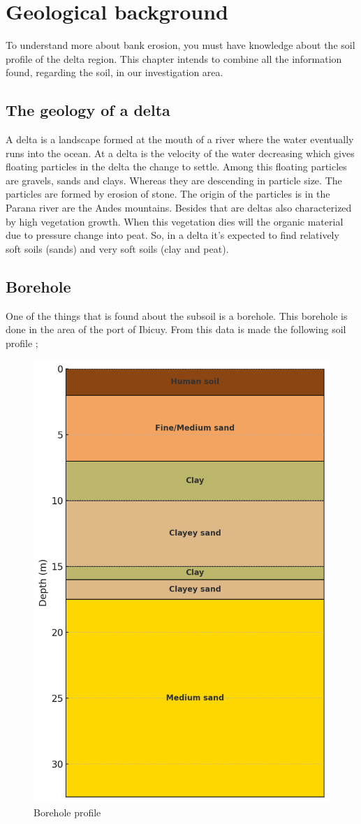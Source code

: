 \chapter{Geological background}

To understand more about bank erosion, you must have knowledge about the soil profile of the delta region. This chapter intends to combine all the information found, regarding the soil, in our investigation area.

\section{The geology of a delta}
A delta is a landscape formed at the mouth of a river where the water eventually runs into the ocean. At a delta is the velocity of the water decreasing which gives floating particles in the delta the change to settle. Among this floating particles are gravels, sands and clays. Whereas they are descending in particle size. The particles are formed by erosion of stone. The origin of the particles is in the Parana river are the Andes mountains. 
Besides that are deltas also characterized by high vegetation growth. When this vegetation dies will the organic material due to pressure change into peat. So, in a delta it's expected to find relatively soft soils (sands) and very soft soils (clay and peat). 

\section{Borehole}
One of the things that is found about the subsoil is a borehole. This borehole is done in the area of the port of Ibicuy. From this data is made the following soil profile \autocite{amatoESTRATIGRAFIACUATERNARIASUBSUELO2009};

\begin{figure}[H]
    \centering
    \includegraphics[width=0.45\linewidth]{figures//ch9/Bodemprofiel.png}
    \caption{Borehole profile}
    \label{fig:placeholder}
\end{figure}

